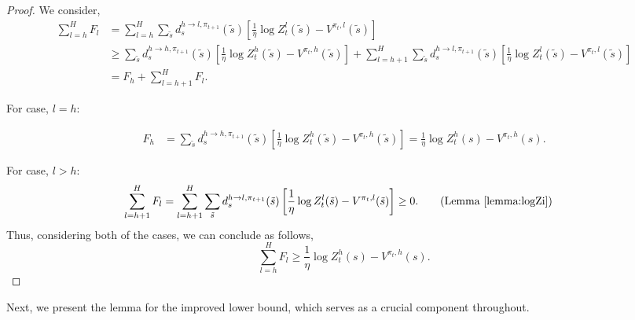 \documentclass[11pt]{article}
\begin{document}
\begin{proof}
We consider,
\begin{align*} 
    \sum^H_{l=h} F_l &  = \sum^H_{l=h} \sum_{\tilde{s}} d^{{h} \to {l}, \pi_{t+1}}_s (\tilde{s}) \left[\frac{1}{\eta}  \log{Z^{l}_t(\tilde{s})}-V^{\pi_t, l} (\tilde{s})\right] \\
    & \geq \sum_{\tilde{s}} d^{{h} \to {h}, \pi_{t+1}}_s (\tilde{s}) \left[\frac{1}{\eta}  \log{Z^{h}_t(\tilde{s})}-V^{\pi_t, h} (\tilde{s})\right] + \sum^H_{l=h+1} \sum_{\tilde{s}} d^{{h} \to {l}, \pi_{t+1}}_s (\tilde{s}) \left[\frac{1}{\eta}  \log{Z^{l}_t(\tilde{s})}-V^{\pi_t, l} (\tilde{s})\right] \\
    & = F_h + \sum^H_{l=h+1} {F_l}.
\end{align*}

For case, $l=h$:

\begin{align*} 
    F_h & = \sum_{\tilde{s}} d^{{h} \to {h}, \pi_{t+1}}_s (\tilde{s}) \left[\frac{1}{\eta}  \log{Z^{h}_t(\tilde{s})}-V^{\pi_t, h} (\tilde{s})\right]  = \frac{1}{\eta}  \log{Z^{h}_t(s)}-V^{\pi_t, h} (s) . 
\end{align*}

For case, $l >  h$:
\vspace{-5pt}
\begin{align*} 
    \sum^H_{l=h+1} {F_l} & = \sum^H_{l=h+1} \sum_{\tilde{s}} d^{{h} \to {l}, \pi_{t+1}}_s (\tilde{s}) \left[\frac{1}{\eta}  \log{Z^{l}_t(\tilde{s})}-V^{\pi_t, l} (\tilde{s}) \right] \geq 0  . \tag{\text Lemma \ref{lemma:logZi}}
\end{align*}
Thus, considering both of the cases, we can conclude as follows,
\[\sum^H_{l=h} F_l \geq \frac{1}{\eta}  \log{Z^{h}_t(s) }-V^{\pi_t, h} (s).\]
\end{proof}
Next, we present the lemma for the improved lower bound, which serves as a crucial component throughout.
\end{document}

